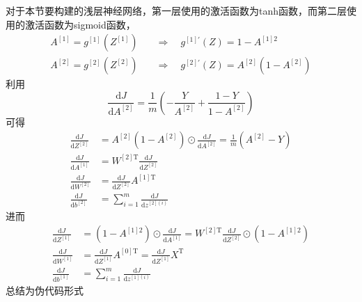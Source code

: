 \vspace{\baselineskip}
对于本节要构建的浅层神经网络，第一层使用的激活函数为tanh函数，而第二层使用的激活函数为sigmoid函数，
\begin{align}
    A^{[1]} = g^{[1]}(Z^{[1]}) &\quad \Rightarrow \quad g^{[1]'}(Z) = 1-A^{[1]2} \\
    A^{[2]} = g^{[2]}(Z^{[2]}) &\quad \Rightarrow \quad g^{[2]'}(Z) = A^{[2]}(1-A^{[2]})
\end{align}
利用
\begin{equation}
    \frac{\mathrm{d}J}{\mathrm{d}A^{[2]}} 
    = \frac{1}{m} \left(-\frac{Y}{A^{[2]}} + \frac{1 - Y}{1 - A^{[2]}}\right)
\end{equation}
可得
\begin{align}
    \frac{\mathrm{d}J}{\mathrm{d}Z^{[2]}} &= A^{[2]}(1-A^{[2]}) \odot \frac{\mathrm{d}J}{\mathrm{d}A^{[2]}} = \frac{1}{m}(A^{[2]}-Y) \\
    \frac{\mathrm{d}J}{\mathrm{d}A^{[1]}} &= W^{[2] \mathrm{T}} \frac{\mathrm{d}J}{\mathrm{d}Z^{[2]}} \\
    \frac{\mathrm{d}J}{\mathrm{d}W^{[2]}} &= \frac{\mathrm{d}J}{\mathrm{d}Z^{[2]}} A^{[1] \mathrm{T}} \\
    \frac{\mathrm{d}J}{\mathrm{d}b^{[2]}} &= \sum_{i=1}^{m} \frac{\mathrm{d}J}{\mathrm{d}z^{[2](i)}}
\end{align}
进而
\begin{align}
    \frac{\mathrm{d}J}{\mathrm{d}Z^{[1]}} &= (1-A^{[1]2}) \odot \frac{\mathrm{d}J}{\mathrm{d}A^{[1]}} = W^{[2] \mathrm{T}} \frac{\mathrm{d}J}{\mathrm{d}Z^{[2]}} \odot (1-A^{[1]2}) \\
    \frac{\mathrm{d}J}{\mathrm{d}W^{[1]}} &= \frac{\mathrm{d}J}{\mathrm{d}Z^{[1]}} A^{[0] \mathrm{T}} = \frac{\mathrm{d}J}{\mathrm{d}Z^{[1]}} X^{\mathrm{T}} \\
    \frac{\mathrm{d}J}{\mathrm{d}b^{[1]}} &= \sum_{i=1}^{m} \frac{\mathrm{d}J}{\mathrm{d}z^{[1](i)}}
\end{align}
总结为伪代码形式
